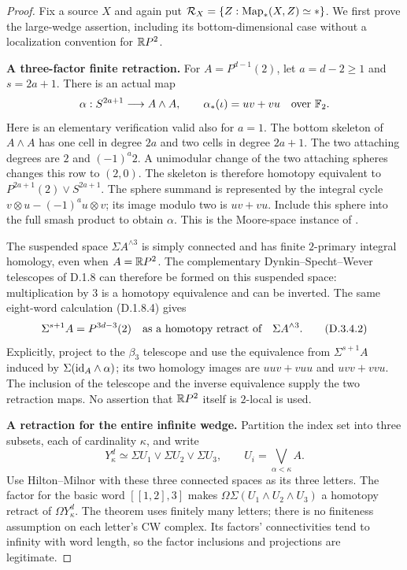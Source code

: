 \begin{proof}
Fix a source $X$ and again put
$\mathcal R_X=\{Z:\operatorname{Map}_*(X,Z)\simeq *\}$.
We first prove the large-wedge assertion, including its
bottom-dimensional case without a localization convention for
$\mathbb{R}P^2$.

\medskip\noindent
\textbf{A three-factor finite retraction.}
For $A=P^{d-1}(2)$, let $a=d-2\geq1$ and $s=2a+1$.
There is an actual map
\[
 \alpha:S^{2a+1}\longrightarrow A\wedge A,
 \qquad \alpha_*(\iota)=uv+vu\quad\hbox{over }\mathbb F_2.
\]
Here is an elementary verification valid also for $a=1$.
The bottom skeleton of $A\wedge A$ has one cell in degree
$2a$ and two cells in degree $2a+1$. The two attaching degrees
are $2$ and $(-1)^a2$. A unimodular change of the two attaching
spheres changes this row to $(2,0)$. The skeleton is therefore
homotopy equivalent to $P^{2a+1}(2)\vee S^{2a+1}$.
The sphere summand is represented by the integral cycle
$v\otimes u-(-1)^a u\otimes v$; its image modulo two is
$uv+vu$. Include this sphere into the full smash product to
obtain $\alpha$. This is the Moore-space instance of
\cite[Proposition~2.1]{I_ChenWu2013}.

The suspended space $\Sigma A^{\wedge3}$ is simply connected
and has finite $2$-primary integral homology, even when
$A=\mathbb{R}P^2$. The complementary Dynkin--Specht--Wever telescopes
of D.1.8 can therefore be formed on this suspended space:
multiplication by $3$ is a homotopy equivalence and can be
inverted. The same eight-word calculation (D.1.8.4) gives
\[
 \Sigma^{s+1}A=P^{3d-3}(2)
       \quad\hbox{as a homotopy retract of}\quad
       \Sigma A^{\wedge3}.
 \tag{D.3.4.2}
\]
Explicitly, project to the $\beta_3$ telescope and use the
equivalence from $\Sigma^{s+1}A$ induced by
$\Sigma(\mathrm{id}_A\wedge\alpha)$; its two homology images are
$uuv+vuu$ and $uvv+vvu$. The inclusion of the telescope and
the inverse equivalence supply the two retraction maps.
No assertion that $\mathbb{R}P^2$ itself is $2$-local is used.

\medskip\noindent
\textbf{A retraction for the entire infinite wedge.}
Partition the index set into three subsets, each of cardinality
$\kappa$, and write
\[
 Y_\kappa^d\simeq\Sigma U_1\vee\Sigma U_2\vee\Sigma U_3,
 \qquad U_i=\bigvee_{\alpha<\kappa}A.
\]
Use Hilton--Milnor with these three connected spaces as its
three letters. The factor for the basic word $[[1,2],3]$ makes
$\Omega\Sigma(U_1\wedge U_2\wedge U_3)$ a homotopy retract of
$\Omega Y_\kappa^d$. The theorem uses finitely many letters;
there is no finiteness assumption on each letter's CW complex.
Its factors' connectivities tend to infinity with word length,
so the factor inclusions and projections are legitimate.


\end{proof}
